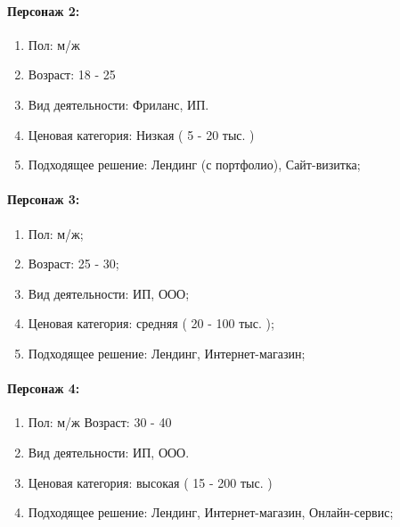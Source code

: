 \paragraph{Персонаж 2:}
\begin{enumerate}
  \item Пол: м/ж
  \item Возраст: 18 - 25
  \item Вид деятельности: Фриланс, ИП.
  \item Ценовая категория: Низкая ( 5 - 20 тыс. )
  \item Подходящее решение: Лендинг (с портфолио), Сайт-визитка;
\end{enumerate}

\paragraph{Персонаж 3:}
\begin{enumerate}
  \item Пол: м/ж;
  \item Возраст: 25 - 30;
  \item Вид деятельности: ИП, ООО;
  \item Ценовая категория: средняя ( 20 - 100 тыс. );
  \item Подходящее решение: Лендинг, Интернет-магазин;
\end{enumerate}

\paragraph{Персонаж 4:}
\begin{enumerate}
  \item Пол: м/ж Возраст: 30 - 40
  \item Вид деятельности: ИП, ООО.
  \item Ценовая категория: высокая ( 15 - 200 тыс. )
  \item Подходящее решение: Лендинг, Интернет-магазин, Онлайн-сервис;
\end{enumerate}

